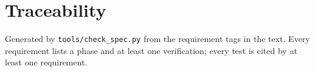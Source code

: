 \section{Traceability}\label{app:traceability}
Generated by \texttt{tools/check\_spec.py} from the requirement tags in the text. Every requirement lists a phase and at least one verification; every test is cited by at least one requirement.

